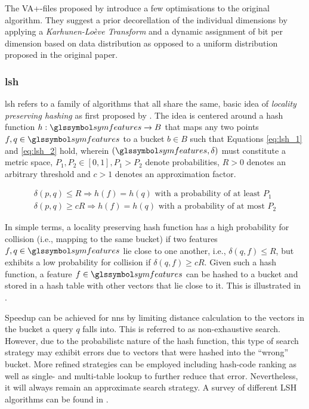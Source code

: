 The VA+-files proposed by \cite{Ferhatosmanoglu:2000Vector} introduce a few optimisations to the original algorithm. They suggest a prior decorellation of the individual dimensions by applying a \emph{Karhunen-Loève Transform} and a dynamic assignment of bit per dimension based on data distribution as opposed to a uniform distribution proposed in the original paper.

\subsubsection{\acrfull{lsh}}

\acrshort{lsh} refers to a family of algorithms \cite{Echihabi:2021High,Wang:2017ASurvey} that all share the same, basic idea of \emph{locality preserving hashing} as first proposed by \cite{Indyk1998:Approximate}. The idea is centered around a hash function $h: \symfeatures \rightarrow B$ that maps any two points $f,q \in \symfeatures$ to a bucket $b \in B$ such that Equations \ref{eq:lsh_1} and \ref{eq:lsh_2} hold, wherein $(\symfeatures, \delta)$ must constitute a metric space, $P_1, P_2 \in [0, 1], P_1 > P_2$ denote probabilities, $R > 0$ denotes an arbitrary threshold and $c > 1$ denotes an approximation factor.

\begin{eqnarray}
    \delta (p,q) \leq R \Rightarrow h(f) = h(q) \text{ with a probability of at least } P_1 \label{eq:lsh_1} \\
    \delta (p,q) \geq cR \Rightarrow h(f) = h(q) \text{ with a probability of at most } P_2 \label{eq:lsh_2}
\end{eqnarray}

In simple terms, a locality preserving hash function has a high probability for collision (i.e., mapping to the same bucket) if two features $f,q \in \symfeatures$ lie close to one another, i.e., $\delta(q,f) \leq R$, but exhibits a low probability for collision if $\delta(q,f) \geq cR$. Given such a hash function, a feature $f \in \symfeatures$ can be hashed to a bucket and stored in a hash table with other vectors that lie close to it. This is illustrated in . 

Speedup can be achieved for \acrshort{nns} by limiting distance calculation to the vectors in the bucket a query $q$ falls into. This is referred to as non-exhaustive search. However, due to the probabilistc nature of the hash function, this type of search strategy may exhibit errors due to vectors that were hashed into the ``wrong'' bucket. More refined strategies can be employed including hash-code ranking as well as single- and multi-table lookup \cite{Wang:2017ASurvey} to further reduce that error. Nevertheless, it will always remain an approximate search strategy. A survey of different LSH algorithms can be found in \cite{Wang:2017ASurvey}.

